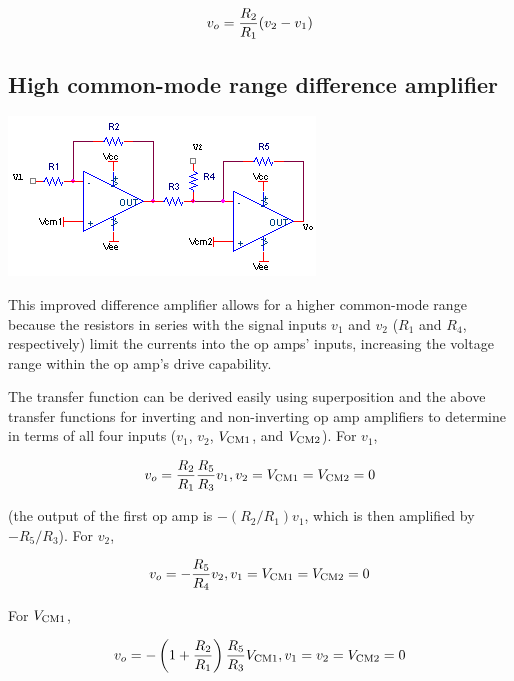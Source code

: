 \textcolor{red}{
\begin{equation}
v_o = \frac{R_2}{R_1}(v_2-v_1)
\label{eq:differenceamp}
\end{equation}
}

\subsection{High common-mode range difference amplifier}
\begin{center}
	\includegraphics{schematics/highcmdifferenceamplifier.PNG}
\end{center}
This improved difference amplifier allows for a higher common-mode range because the resistors in series with the signal inputs $v_1$ and $v_2$ ($R_1$ and $R_4$, respectively) limit the currents into the op amps' inputs, increasing the voltage range within the op amp's drive capability. \autocite[418]{op-amps-for-everyone}

The transfer function can be derived easily using superposition and the above transfer functions for inverting and non-inverting op amp amplifiers to determine \vout in terms of all four inputs ($v_1$, $v_2$, $V_\mathrm{CM1}$, and $V_\mathrm{CM2}$).
For $v_1$,

\begin{equation}
v_o = \frac{R_2}{R_1}\frac{R_5}{R_3}v_1, v_2 = V_\mathrm{CM1} = V_\mathrm{CM2} = 0
\end{equation}

\noindent (the output of the first op amp is $-(R_2/R_1)v_1$, which is then amplified by $-R_5/R_3$).
For $v_2$,

\begin{equation}
v_o = -\frac{R_5}{R_4}v_2, v_1 = V_\mathrm{CM1} = V_\mathrm{CM2} = 0
\end{equation}

\noindent For $V_\mathrm{CM1}$,

\begin{equation}
v_o = -\left(1+\frac{R_2}{R_1}\right)\frac{R_5}{R_3}V_\mathrm{CM1}, v_{1} = v_{2} = V_\mathrm{CM2} = 0
\end{equation}

